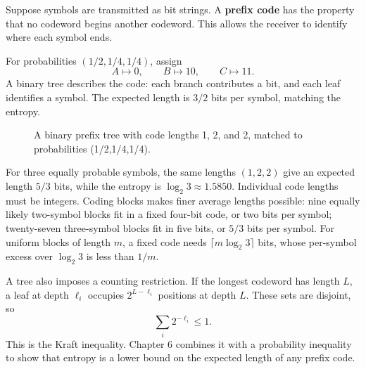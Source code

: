 \documentclass[11pt,oneside,openany]{book}
\theoremstyle{definition}
\theoremstyle{remark}
\numberwithin{equation}{chapter}
\begin{document}
Suppose symbols are transmitted as bit strings. A \textbf{prefix code} has the property that no codeword begins another codeword. This allows the receiver to identify where each symbol ends.

For probabilities \((1/2,1/4,1/4)\), assign \[A\mapsto0,\qquad B\mapsto10,\qquad C\mapsto11.\] A binary tree describes the code: each branch contributes a bit, and each leaf identifies a symbol. The expected length is \(3/2\) bits per symbol, matching the entropy.

\begin{figure}[htbp]\centering
{}
\caption{A binary prefix tree with code lengths 1, 2, and 2, matched to probabilities (1/2,1/4,1/4).}\end{figure}

For three equally probable symbols, the same lengths \((1,2,2)\) give an expected length \(5/3\) bits, while the entropy is \(\log_2 3\approx1.5850\). Individual code lengths must be integers. Coding blocks makes finer average lengths possible: nine equally likely two-symbol blocks fit in a fixed four-bit code, or two bits per symbol; twenty-seven three-symbol blocks fit in five bits, or \(5/3\) bits per symbol. For uniform blocks of length \(m\), a fixed code needs \(\lceil m\log_2 3\rceil\) bits, whose per-symbol excess over \(\log_2 3\) is less than \(1/m\).

A tree also imposes a counting restriction. If the longest codeword has length \(L\), a leaf at depth \(\ell_i\) occupies \(2^{L-\ell_i}\) positions at depth \(L\). These sets are disjoint, so \[\sum_i2^{-\ell_i}\leq1.\] This is the Kraft inequality. Chapter 6 combines it with a probability inequality to show that entropy is a lower bound on the expected length of any prefix code.
\end{document}
